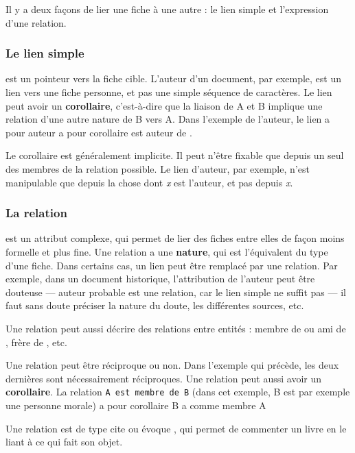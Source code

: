 \documentclass[11pt]{article}
\begin{document}
Il y a deux façons de lier une fiche à une autre : le lien simple et
l'expression d'une relation.

\subsubsection{Le lien simple}\label{le-lien-simple}

est un \og pointeur \fg{} vers la fiche cible. L'auteur d'un document,
par exemple, est un lien vers une fiche personne, et pas une simple
séquence de caractères. Le lien peut avoir un \textbf{corollaire},
c'est-à-dire que la liaison de A et B implique une relation d'une autre
nature de B vers A. Dans l'exemple de l'auteur, le lien \og a pour
auteur \fg{} a pour corollaire \og est auteur de \fg{}.

Le corollaire est généralement implicite. Il peut n'être fixable que
depuis un seul des membres de la relation possible. Le lien d'auteur,
par exemple, n'est manipulable que depuis la chose dont \emph{x} est
l'auteur, et pas depuis \emph{x}.

\subsubsection{La relation}\label{la-relation}

est un attribut complexe, qui permet de lier des fiches entre elles de
façon moins formelle et plus fine. Une relation a une \textbf{nature},
qui est l'équivalent du type d'une fiche. Dans certains cas, un lien
peut être remplacé par une relation. Par exemple, dans un document
historique, l'attribution de l'auteur peut être douteuse --- \og auteur
probable \fg{} est une relation, car le lien simple ne suffit pas --- il
faut sans doute préciser la nature du doute, les différentes sources,
etc.

Une relation peut aussi décrire des relations entre entités : \og membre
de \fg{} ou \og ami de \fg{}, \og frère de \fg{}, etc.

Une relation peut être réciproque ou non. Dans l'exemple qui précède,
les deux dernières sont nécessairement réciproques. Une relation peut
aussi avoir un \textbf{corollaire}. La relation
\texttt{A est membre de B} (dans cet exemple, B est par exemple une
personne morale) a pour corollaire \og B a comme membre A \fg{}

Une relation est de type \og cite \fg{} ou \og évoque \fg{}, qui permet
de commenter un livre en le liant à ce qui fait son objet.
\end{document}
